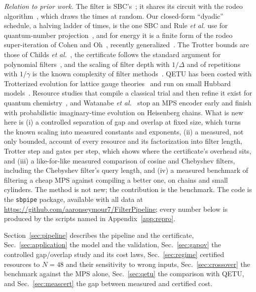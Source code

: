 \documentclass[aps,pra,twocolumn,superscriptaddress,nofootinbib]{revtex4-2}
\begin{document}
\emph{Relation to prior work.} The filter is SBC's~\cite{Stetcu2023}; it shares its circuit with the rodeo
algorithm~\cite{Choi2021,Qian2021}, which draws the times at random. Our closed-form ``dyadic'' schedule, a
halving ladder of times, is the one SBC and Rule \emph{et al.} use for quantum-number
projection~\cite{Stetcu2023,Rule2024}, and for energy it is a finite form of the rodeo super-iteration of Cohen
and Oh~\cite{CohenOh2023}, recently generalized~\cite{Patkowski2026}. The Trotter bounds are those of Childs
\emph{et al.}~\cite{Childs2021}, the certificate follows the standard argument for polynomial
filters~\cite{Lin2020,Dong2022}, and the scaling of filter depth with $1/\Delta$ and of repetitions with
$1/\gamma$ is the known complexity of filter methods~\cite{Ge2019,Lin2020}. QETU has been costed with
Trotterized evolution for lattice gauge theories~\cite{Kane2023} and run on small Hubbard
models~\cite{Muller2024,Karacan2024}. Resource studies that compile a classical trial and then refine it exist for
quantum chemistry~\cite{Fomichev2024,Berry2025,Lee2025}, and Watanabe \emph{et al.}~\cite{Watanabe2026} stop an MPS
encoder early and finish with probabilistic imaginary-time evolution on Heisenberg chains. What is new here is (i) a controlled separation of gap and overlap at fixed
size, which turns the known scaling into measured constants and exponents, (ii) a measured, not only bounded,
account of every resource and its factorization into filter length, Trotter step and gates per step, which shows
where the certificate's overhead sits, and (iii) a like-for-like measured comparison of cosine and Chebyshev
filters, including the Chebyshev filter's query length, and (iv) a measured benchmark of filtering a cheap MPS
against compiling a better one, on chains and small cylinders. The method is not new; the contribution is the benchmark.
The code is the \texttt{sbpipe} package, available with all data at
\url{https://github.com/aaronseymour7/FilterPipeline}; every number below is produced by the scripts named in
Appendix~\ref{app:repro}.

Section~\ref{sec:pipeline} describes the pipeline and the certificate, Sec.~\ref{sec:application} the model and
the validation, Sec.~\ref{sec:gapov} the controlled gap/overlap study and its cost laws, Sec.~\ref{sec:regime}
certified resources to $N=48$ and their sensitivity to wrong inputs, Sec.~\ref{sec:crossover} the benchmark against
the MPS alone, Sec.~\ref{sec:qetu} the comparison with QETU,
and Sec.~\ref{sec:meascert} the gap between measured and certified cost.
\end{document}
